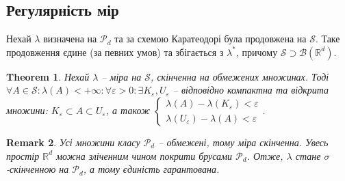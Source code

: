 \documentclass[a4paper, 10pt]{article}
\theoremstyle{theoremdd}
\newtheorem{theorem}{Theorem}[subsection]
\newtheorem{remark}[theorem]{Remark}
\begin{document}
\subsection{Регулярність мір}
Нехай $\lambda$ визначена на $\mathcal{P}_d$ та за схемою Каратеодорі була продовжена на $\mathcal{S}$. Таке продовження єдине (за певних умов) та збігається з $\lambda^*$, причому $\mathcal{S} \supset \mathcal{B}(\mathbb{R}^d)$.

\begin{theorem}
Нехай $\lambda$ -- міра на $\mathcal{S}$, скінченна на обмежених множинах. Тоді $\forall A \in \mathcal{S}: \lambda(A) < +\infty: \forall \varepsilon > 0: \exists K_\varepsilon,U_\varepsilon$ -- відповідно компактна та відкрита множини: $K_\varepsilon \subset A \subset U_\varepsilon$, а також $\begin{cases} \lambda(A) - \lambda(K_\varepsilon) < \varepsilon \\ \lambda(U_\varepsilon) - \lambda(A) < \varepsilon \end{cases}$.
\end{theorem}

\begin{remark}
Усі множини класу $\mathcal{P}_d$ -- обмежені, тому міра скінченна. Увесь простір $\mathbb{R}^d$ можна зліченним чином покрити брусами $\mathcal{P}_d$. Отже, $\lambda$ стане $\sigma$-скінченною на $\mathcal{P}_d$, а тому єдиність гарантована.
\end{remark}
\end{document}
